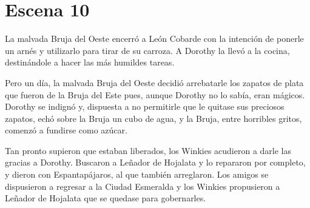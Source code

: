 \chapter{Escena 10}
La malvada Bruja del Oeste encerró a León Cobarde con la intención de ponerle un arnés y utilizarlo para tirar de su carroza. A Dorothy la llevó a la cocina, destinándole a hacer las más humildes tareas.

Pero un día, la malvada Bruja del Oeste decidió arrebatarle los zapatos de plata que fueron de la Bruja del Este pues, aunque Dorothy no lo sabía, eran mágicos. Dorothy se indignó y, dispuesta a no permitirle que le quitase sus preciosos zapatos, echó sobre la Bruja un cubo de agua, y la Bruja, entre horribles gritos, comenzó a fundirse como azúcar.

Tan pronto supieron que estaban liberados, los Winkies acudieron a darle las gracias a Dorothy. Buscaron a Leñador de Hojalata y lo repararon por completo, y dieron con Espantapájaros, al que también arreglaron. Los amigos se dispusieron a regresar a la Ciudad Esmeralda y los Winkies propusieron a Leñador de Hojalata que se quedase para gobernarles.